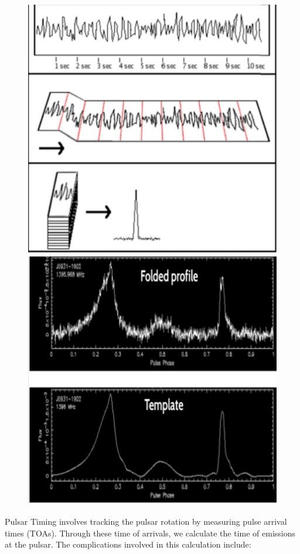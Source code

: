 \documentclass{article}
\begin{document}
\begin{figure}[htbp] %
\centering
\begin{minipage}{.5\textwidth}
  \centering
  \includegraphics[width=0.7\linewidth]{Images/Pulsar2.png}
\end{minipage}%
\begin{minipage}{.5\textwidth}
  \centering
  \includegraphics[width=0.7\linewidth]{Images/Pulsar3.png}
\end{minipage}
\end{figure}

Pulsar Timing involves tracking the pulsar rotation by measuring pulse arrival times (TOAs).  Through these time of arrivals, we calculate  the time of emissions at the pulsar. The complications involved in this calculation include:
\end{document}
